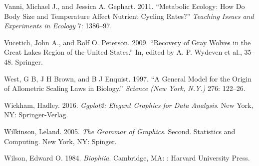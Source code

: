 \documentclass[
  letterpaper,
  DIV=11,
  numbers=noendperiod]{scrreprt}
\newlength{\cslhangindent}
\newenvironment{CSLReferences}[2] %
 {\begin{list}{}{%
  \setlength{\itemindent}{0pt}
  \setlength{\leftmargin}{0pt}
  \setlength{\parsep}{0pt}
  \ifodd #1
   \setlength{\leftmargin}{\cslhangindent}
   \setlength{\itemindent}{-1\cslhangindent}
  \fi
  \setlength{\itemsep}{#2\baselineskip}}}
 {\end{list}}
\begin{document}
\begin{CSLReferences}{1}{0}
Vanni, Michael J., and Jessica A. Gephart. 2011. {``Metabolic {Ecology}:
{How Do Body Size} and {Temperature Affect Nutrient Cycling Rates}?''}
\emph{Teaching Issues and Experiments in Ecology} 7: 1386--97.

Vucetich, John A., and Rolf O. Peterson. 2009. {``Recovery of Gray
Wolves in the Great Lakes Region of the United States.''} In, edited by
A. P. Wydeven et al., 35--48. {Springer}.

West, G B, J H Brown, and B J Enquist. 1997. {``A {General Model} for
the {Origin} of {Allometric Scaling Laws} in {Biology}.''} \emph{Science
(New York, N.Y.)} 276: 122--26.

Wickham, Hadley. 2016. \emph{Ggplot2: {Elegant Graphics} for {Data
Analysis}}. {New York, NY}: {Springer-Verlag}.

Wilkinson, Leland. 2005. \emph{The {Grammar} of {Graphics}}. Second.
Statistics and Computing. {New York, NY}: {Spinger}.

Wilson, Edward O. 1984. \emph{Biophiia}. {Cambridge, MA}: {: Harvard
University Press}.

\end{CSLReferences}
\end{document}
